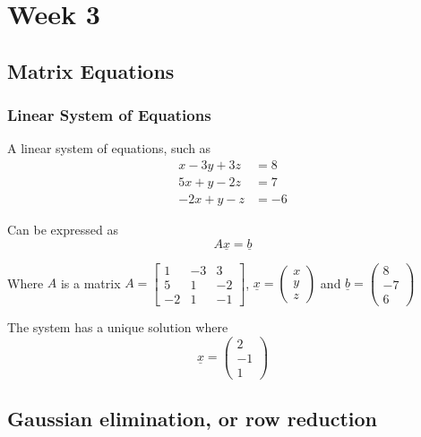 \chapter{Week 3}

\section{Matrix Equations}

\subsection{Linear System of Equations}

\begin{framed}
   A linear system of equations, such as 
   \begin{align*}
      x - 3y + 3z &= 8 \\
      5x + y - 2z &= 7 \\
      -2x + y -z &= -6
   \end{align*}

   Can be expressed as \[
     A \underline{x} = \underline{b}
   \] 

   Where $A$ is a matrix $
     A =  \begin{bmatrix} 
           1 & -3 & 3 \\  
           5 & 1 & -2 \\  
           -2 & 1 & -1
     \end{bmatrix}
      $, $ \underline{x} = \begin{pmatrix} x \\ y \\ z \end{pmatrix} $ and $ \underline{b} = \begin{pmatrix} 8 \\ -7 \\ 6 \end{pmatrix} $
   
     The system has a unique solution where \[
       \underline{x} = \begin{pmatrix} 2 \\ -1 \\ 1 \end{pmatrix} 
     \] 
\end{framed}

\section{Gaussian elimination, or row reduction}

